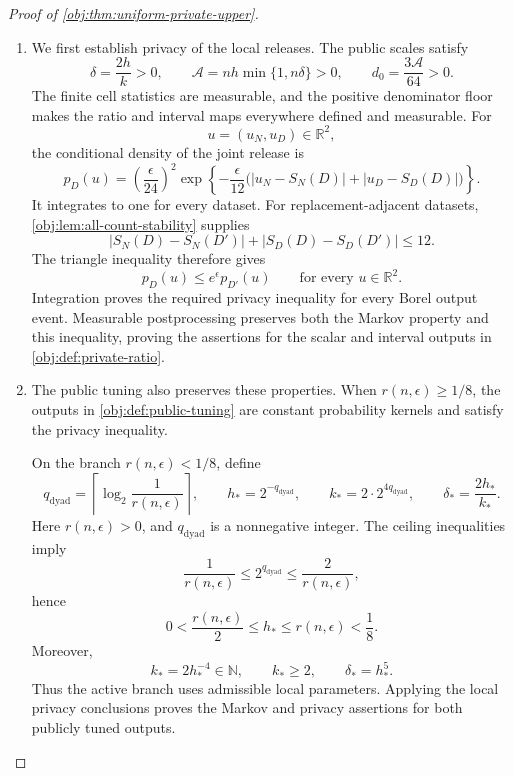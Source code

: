 \begin{proof}[Proof of \cref{obj:thm:uniform-private-upper}]
\begin{enumerate}
\item
We first establish privacy of the local releases. The public scales satisfy
\[
\delta=\frac{2h}{k}>0,
\qquad
\mathcal A=nh\min\{1,n\delta\}>0,
\qquad
d_0=\frac{3\mathcal A}{64}>0.
\]
The finite cell statistics are measurable, and the positive denominator floor makes the ratio and interval maps everywhere defined and measurable. For
\[
u=(u_N,u_D)\in\mathbb R^2,
\]
the conditional density of the joint release is
\[
p_D(u)
=
\left(\frac{\epsilon}{24}\right)^2
\exp\left\{
-\frac{\epsilon}{12}
\bigl(|u_N-S_N(D)|+|u_D-S_D(D)|\bigr)
\right\}.
\]
It integrates to one for every dataset. For replacement-adjacent datasets, \cref{obj:lem:all-count-stability} supplies
\[
|S_N(D)-S_N(D')|+|S_D(D)-S_D(D')|\le12.
\]
The triangle inequality therefore gives
\[
p_D(u)\le e^\epsilon p_{D'}(u)
\qquad\text{for every }u\in\mathbb R^2.
\]
Integration proves the required privacy inequality for every Borel output event. Measurable postprocessing preserves both the Markov property and this inequality, proving the assertions for the scalar and interval outputs in \cref{obj:def:private-ratio}.

\item
The public tuning also preserves these properties. When \(r(n,\epsilon)\ge1/8\), the outputs in \cref{obj:def:public-tuning} are constant probability kernels and satisfy the privacy inequality.

On the branch \(r(n,\epsilon)<1/8\), define
\[
q_{\mathrm{dyad}}
=
\left\lceil\log_2\frac1{r(n,\epsilon)}\right\rceil,
\qquad
h_* =2^{-q_{\mathrm{dyad}}},
\qquad
k_* =2\cdot2^{4q_{\mathrm{dyad}}},
\qquad
\delta_*=\frac{2h_*}{k_*}.
\]
Here \(r(n,\epsilon)>0\), and \(q_{\mathrm{dyad}}\) is a nonnegative integer. The ceiling inequalities imply
\[
\frac1{r(n,\epsilon)}
\le2^{q_{\mathrm{dyad}}}
\le\frac2{r(n,\epsilon)},
\]
hence
\[
0<\frac{r(n,\epsilon)}2
\le h_*
\le r(n,\epsilon)<\frac18.
\]
Moreover,
\[
k_*=2h_*^{-4}\in\mathbb N,
\qquad
k_*\ge2,
\qquad
\delta_*=h_*^5.
\]
Thus the active branch uses admissible local parameters. Applying the local privacy conclusions proves the Markov and privacy assertions for both publicly tuned outputs.


\end{enumerate}
\end{proof}
